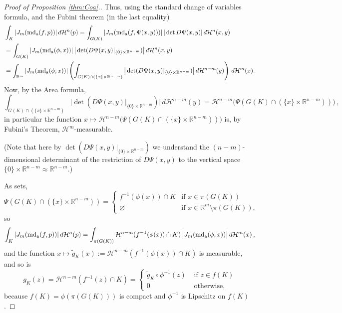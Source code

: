 \documentclass[12pt,leqno]{amsart}
\theoremstyle{definition}
\newcommand{\bbbr}{\mathbb R}
\def\H{{\mathcal H}}
\def\apmd{\operatorname{md_{\rm a}}}
\numberwithin{theorem}{section} \numberwithin{equation}{section}
\begin{document}
\begin{proof}[Proof of Proposition \ref{thm:Coa}.]
Thus, using the standard change of variables formula, and the Fubini theorem (in the last equality)
\[
\begin{split}
&
\int_K|J_m(\apmd(f,p))|\,d\H^n(p)
=
\int_{G(K)}|J_m(\apmd(f,\Psi(x,y)))|\,|\det D\Psi(x,y)|\,d\H^n(x,y)\\
&=
\int_{G(K)}|J_m(\apmd(\phi,x))|\, \big|\det (D\Psi(x,y)|_{\{0\}\times\bbbr^{n-m}})\big|\,d\H^n(x,y)\\
&=
\int_{\bbbr^m} |J_m(\apmd(\phi,x))|\left(\int_{G(K)\cap({\{x\}\times\bbbr^{n-m}})} \big|\det (D\Psi(x,y)|_{\{0\}\times\bbbr^{n-m}})\big|\,d\H^{n-m}(y)\right)\,d\H^m(x).
\end{split}
\]
Now, by the Area formula,
$$
\int_{G(K)\cap({\{x\}\times\bbbr^{n-m}})} \big|\det (D\Psi(x,y)|_{\{0\}\times\bbbr^{n-m}})\big|\,d\H^{n-m}(y)=
\H^{n-m}\big(\Psi(G(K)\cap (\{x\}\times \bbbr^{n-m}))\big)\, ,
$$
in particular the function $x\mapsto \H^{n-m}\big(\Psi(G(K)\cap (\{x\}\times \bbbr^{n-m}))\big)$ is, by Fubini's Theorem, $\H^m$-measurable.

(Note that here by $\det (D\Psi(x,y)|_{\{0\}\times\bbbr^{n-m}})$ we understand the $(n-m)$-dimensional determinant of the restriction of $D\Psi(x,y)$ to the vertical space ${\{0\}\times\bbbr^{n-m}}\approx \bbbr^{n-m}$.)


As sets,
$$
\Psi(G(K)\cap (\{x\}\times \bbbr^{n-m})) =
\begin{cases}
f^{-1}(\phi(x)) \cap {K} & \text{if } x\in \pi(G(K))\\
\varnothing &\text{if } x\in\bbbr^m\setminus \pi(G(K)),
\end{cases}
$$
so
\begin{equation*}
\begin{split}
\int_K|J_m(\apmd(f,p))|\,d\H^n(p)=
\int_{\pi(G(K))} \H^{n-m}(f^{-1}(\phi(x)) \cap {K})\, \big|J_m(\apmd(\phi,x))\big|\,d\H^{m}(x) \,,
\end{split}
\end{equation*}
and the function $x\mapsto \tilde{g}_K(x):=\H^{n-m}(f^{-1}(\phi(x)) \cap {K})$ is measurable, and so is
$$
g_K(z)=\H^{n-m}(f^{-1}(z) \cap {K})=\begin{cases} \tilde{g}_K\circ\phi^{-1}(z)&\text{ if }z\in f(K)\\
0& \text{ otherwise,}\end{cases}
$$
because $f(K)=\phi(\pi(G(K)))$ is compact and $\phi^{-1}$ is Lipschitz on $f(K)$.


\end{proof}
\end{document}

